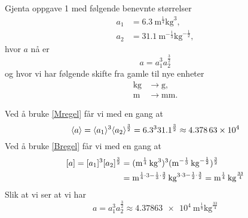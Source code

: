 \documentclass[a4paper,11pt]{article}
\begin{document}

\begin{problem}
    Gjenta oppgave 1 med følgende benevnte størrelser
    \begin{align*}
      a_1 &= \SI{6.3}{\m\tothe{\frac{1}{4}}\kg\cubed},\\
      a_2 &= \SI{31.1}{\m\tothe{-\frac{1}{3}}\kg\tothe{-\frac{1}{2}}},
    \end{align*}
    hvor $a$ nå er
    \begin{equation*}
      a = a_1^3 a_2^{\frac{3}{2}}
    \end{equation*}
    og hvor vi har følgende skifte fra gamle til nye enheter
    \begin{align*}
      \si{\kg} &\rightarrow \si{\g},\\
      \si{\m} &\rightarrow \si{\milli\m}.
    \end{align*}
\end{problem}
\begin{solution}
    Ved å bruke \cref{Mregel} får vi med en gang at 
    \begin{equation*}
          \langle a\rangle 
        = \langle a_1\rangle^{3}\langle a_2\rangle^{\frac{3}{2}}
        = \num{6.3}^{3}\num{31.1}^{\frac{3}{2}}
        \approx \num{4.37863e4}
    \end{equation*}
    Ved å bruke \cref{Bregel} får vi med en gang at 
    \begin{align*}
            \bpar{a} 
          = \bpar{a_1}^{3}\bpar{a_2}^{\frac{3}{2}}
        & = (\si{\m\tothe{\frac{1}{4}}\kg\cubed})^{3}
            (\si{\m\tothe{-\frac{1}{3}}\kg\tothe{-\frac{1}{2}}})^{\frac{3}{2}} \\
        & = \si{\m\tothe{\frac{1}{4}\cdot 3 - \frac{1}{3}\cdot \frac{3}{2}}%
                \kg\tothe{3\cdot 3 - \frac{1}{2} \cdot \frac{3}{2}}}
          = \si{\m\tothe{\frac{1}{4}}\kg\tothe{\frac{33}{4}}}
    \end{align*}
    Slik at vi ser at vi har
    \begin{equation*}
        a = a_1^3 a_2^{\frac{3}{2}} 
          \approx \SI{4.37863e4}{\m\tothe{\frac{1}{4}}\kg\tothe{\frac{33}{4}}}
    \end{equation*}
\end{solution}
\end{document}
